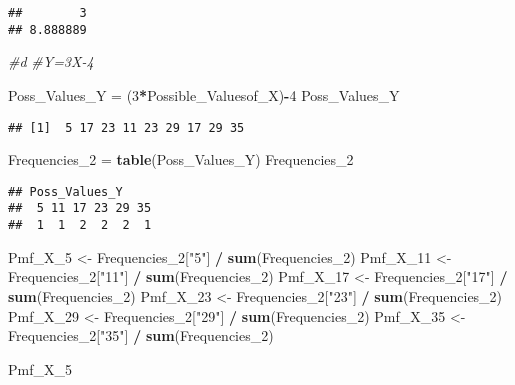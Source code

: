 \documentclass[
]{article}
\newenvironment{Shaded}{\begin{snugshade}}{\end{snugshade}}
\newcommand{\CommentTok}[1]{\textcolor[rgb]{0.56,0.35,0.01}{\textit{#1}}}
\newcommand{\DecValTok}[1]{\textcolor[rgb]{0.00,0.00,0.81}{#1}}
\newcommand{\FunctionTok}[1]{\textcolor[rgb]{0.13,0.29,0.53}{\textbf{#1}}}
\newcommand{\NormalTok}[1]{#1}
\newcommand{\OtherTok}[1]{\textcolor[rgb]{0.56,0.35,0.01}{#1}}
\newcommand{\SpecialCharTok}[1]{\textcolor[rgb]{0.81,0.36,0.00}{\textbf{#1}}}
\newcommand{\StringTok}[1]{\textcolor[rgb]{0.31,0.60,0.02}{#1}}
\begin{document}
\begin{verbatim}
##        3 
## 8.888889
\end{verbatim}

\begin{Shaded}
\begin{Highlighting}[]
\CommentTok{\#d}
\CommentTok{\#Y=3X{-}4}

\NormalTok{Poss\_Values\_Y }\OtherTok{=}\NormalTok{ (}\DecValTok{3}\SpecialCharTok{*}\NormalTok{Possible\_Valuesof\_X)}\SpecialCharTok{{-}}\DecValTok{4}
\NormalTok{Poss\_Values\_Y}
\end{Highlighting}
\end{Shaded}

\begin{verbatim}
## [1]  5 17 23 11 23 29 17 29 35
\end{verbatim}

\begin{Shaded}
\begin{Highlighting}[]
\NormalTok{Frequencies\_2 }\OtherTok{=} \FunctionTok{table}\NormalTok{(Poss\_Values\_Y)}
\NormalTok{Frequencies\_2}
\end{Highlighting}
\end{Shaded}

\begin{verbatim}
## Poss_Values_Y
##  5 11 17 23 29 35 
##  1  1  2  2  2  1
\end{verbatim}

\begin{Shaded}
\begin{Highlighting}[]
\NormalTok{Pmf\_X\_5 }\OtherTok{\textless{}{-}}\NormalTok{ Frequencies\_2[}\StringTok{"5"}\NormalTok{] }\SpecialCharTok{/} \FunctionTok{sum}\NormalTok{(Frequencies\_2)}
\NormalTok{Pmf\_X\_11 }\OtherTok{\textless{}{-}}\NormalTok{ Frequencies\_2[}\StringTok{"11"}\NormalTok{] }\SpecialCharTok{/} \FunctionTok{sum}\NormalTok{(Frequencies\_2)}
\NormalTok{Pmf\_X\_17 }\OtherTok{\textless{}{-}}\NormalTok{ Frequencies\_2[}\StringTok{"17"}\NormalTok{] }\SpecialCharTok{/} \FunctionTok{sum}\NormalTok{(Frequencies\_2)}
\NormalTok{Pmf\_X\_23 }\OtherTok{\textless{}{-}}\NormalTok{ Frequencies\_2[}\StringTok{"23"}\NormalTok{] }\SpecialCharTok{/} \FunctionTok{sum}\NormalTok{(Frequencies\_2)}
\NormalTok{Pmf\_X\_29 }\OtherTok{\textless{}{-}}\NormalTok{ Frequencies\_2[}\StringTok{"29"}\NormalTok{] }\SpecialCharTok{/} \FunctionTok{sum}\NormalTok{(Frequencies\_2)}
\NormalTok{Pmf\_X\_35 }\OtherTok{\textless{}{-}}\NormalTok{ Frequencies\_2[}\StringTok{"35"}\NormalTok{] }\SpecialCharTok{/} \FunctionTok{sum}\NormalTok{(Frequencies\_2)}

\NormalTok{Pmf\_X\_5}
\end{Highlighting}
\end{Shaded}
\end{document}
